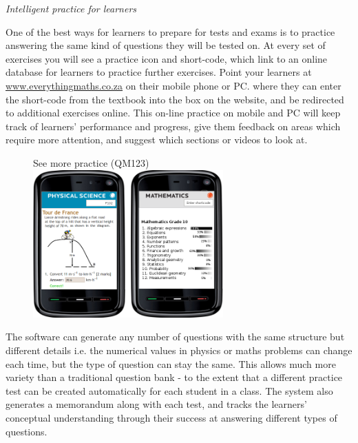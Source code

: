 \newpage
\thispagestyle{empty}
{\Large


{\normalfont\sffamily\fontsize{22}\normalfont\itshape Intelligent practice for learners} \par

One of the best ways for learners to prepare for tests and exams is to practice answering the same kind of questions they will be tested on. At every set of exercises you will see a practice icon and short-code, which link to an online database for learners to practice further exercises. Point your learners at \underline{www.everythingmaths.co.za} on their mobile phone or PC. where they can enter the short-code from the textbook into the box on the website, and be redirected to additional exercises online. This on-line practice on mobile and PC will keep track of learners' performance and progress, give them feedback on areas which require more attention, and suggest which sections or videos to look at.\par
\begin{figure}[H]
\begin{center}
See more practice  (QM123)\\ 
\includegraphics[width=0.65\textwidth]{../title_images/practicephones.png}
\end{center}
\end{figure}
\par
The software can generate any number of questions with the same structure but different details i.e. the numerical values in physics or maths problems can change each time, but the type of question can stay the same. This allows much more variety than a traditional question bank - to the extent that a different practice test can be created automatically for each student in a class. The system also generates a memorandum along with each test, and tracks the learners' conceptual understanding through their success at answering different types of questions.\par

}
